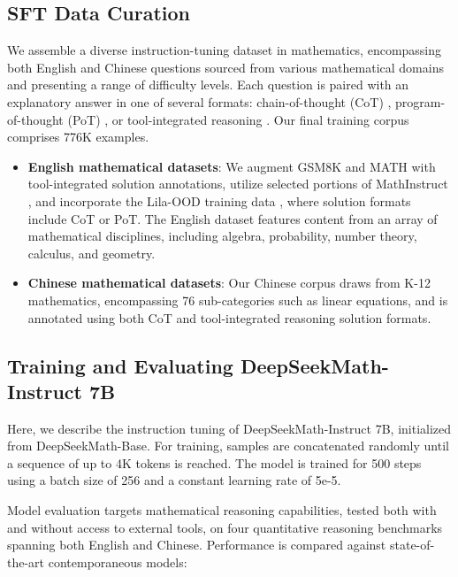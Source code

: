 \subsection{SFT Data Curation}

We assemble a diverse instruction-tuning dataset in mathematics, encompassing both English and Chinese questions sourced from various mathematical domains and presenting a range of difficulty levels. Each question is paired with an explanatory answer in one of several formats: chain-of-thought (CoT) \citep{cot}, program-of-thought (PoT) \citep{pot,pal}, or tool-integrated reasoning \citep{tora}. Our final training corpus comprises 776K examples.

\begin{itemize}[topsep=0pt]
    \item \textbf{English mathematical datasets}: We augment GSM8K and MATH with tool-integrated solution annotations, utilize selected portions of MathInstruct \citep{MathInstruct}, and incorporate the Lila-OOD training data \citep{lila}, where solution formats include CoT or PoT. The English dataset features content from an array of mathematical disciplines, including algebra, probability, number theory, calculus, and geometry.
    \item \textbf{Chinese mathematical datasets}: Our Chinese corpus draws from K-12 mathematics, encompassing 76 sub-categories such as linear equations, and is annotated using both CoT and tool-integrated reasoning solution formats.
\end{itemize}

\subsection{Training and Evaluating DeepSeekMath-Instruct 7B}

Here, we describe the instruction tuning of DeepSeekMath-Instruct 7B, initialized from DeepSeekMath-Base. For training, samples are concatenated randomly until a sequence of up to 4K tokens is reached. The model is trained for 500 steps using a batch size of 256 and a constant learning rate of 5e-5.

Model evaluation targets mathematical reasoning capabilities, tested both with and without access to external tools, on four quantitative reasoning benchmarks spanning both English and Chinese. Performance is compared against state-of-the-art contemporaneous models:


